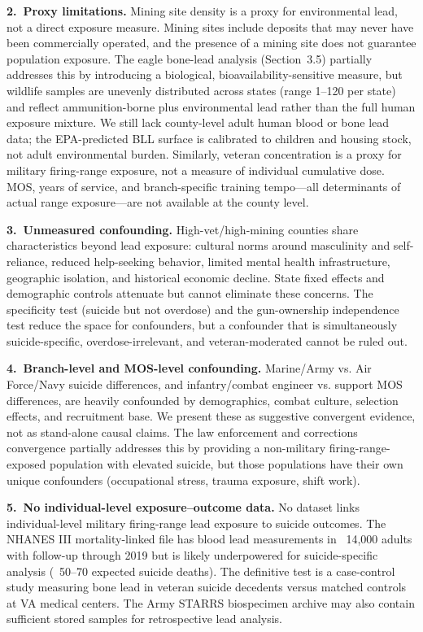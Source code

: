 \documentclass[11pt,twocolumn]{article}
\begin{document}
\textbf{2.~Proxy limitations.} Mining site density is a proxy for environmental lead, not a direct exposure measure. Mining sites include deposits that may never have been commercially operated, and the presence of a mining site does not guarantee population exposure. The eagle bone-lead analysis (Section~3.5) partially addresses this by introducing a biological, bioavailability-sensitive measure, but wildlife samples are unevenly distributed across states (range 1--120 per state) and reflect ammunition-borne plus environmental lead rather than the full human exposure mixture. We still lack county-level adult human blood or bone lead data; the EPA-predicted BLL surface is calibrated to children and housing stock, not adult environmental burden. Similarly, veteran concentration is a proxy for military firing-range exposure, not a measure of individual cumulative dose. MOS, years of service, and branch-specific training tempo---all determinants of actual range exposure---are not available at the county level.

\textbf{3.~Unmeasured confounding.} High-vet/high-mining counties share characteristics beyond lead exposure: cultural norms around masculinity and self-reliance, reduced help-seeking behavior, limited mental health infrastructure, geographic isolation, and historical economic decline. State fixed effects and demographic controls attenuate but cannot eliminate these concerns. The specificity test (suicide but not overdose) and the gun-ownership independence test reduce the space for confounders, but a confounder that is simultaneously suicide-specific, overdose-irrelevant, and veteran-moderated cannot be ruled out.

\textbf{4.~Branch-level and MOS-level confounding.} Marine/Army vs. Air Force/Navy suicide differences, and infantry/combat engineer vs. support MOS differences, are heavily confounded by demographics, combat culture, selection effects, and recruitment base. We present these as suggestive convergent evidence, not as stand-alone causal claims. The law enforcement and corrections convergence partially addresses this by providing a non-military firing-range-exposed population with elevated suicide, but those populations have their own unique confounders (occupational stress, trauma exposure, shift work).

\textbf{5.~No individual-level exposure--outcome data.} No dataset links individual-level military firing-range lead exposure to suicide outcomes. The NHANES III mortality-linked file has blood lead measurements in ~14,000 adults with follow-up through 2019 but is likely underpowered for suicide-specific analysis (~50--70 expected suicide deaths). The definitive test is a case-control study measuring bone lead in veteran suicide decedents versus matched controls at VA medical centers. The Army STARRS biospecimen archive may also contain sufficient stored samples for retrospective lead analysis.
\end{document}
